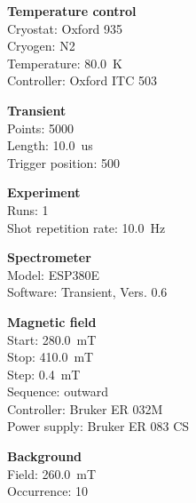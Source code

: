 \documentclass{article}
\begin{document}
\begin{multicols}{2}

	\begin{minipage}{.49\textwidth}
	\textbf{Temperature control}\\
						Cryostat: Oxford 935
			\\
								Cryogen: N2
			\\
								Temperature: 80.0~K
			\\
								Controller: Oxford ITC 503
			\\
				\end{minipage}
	\begin{minipage}{.49\textwidth}
	\textbf{Transient}\\
						Points: 5000
			\\
								Length: 10.0~us
			\\
								Trigger position: 500
			\\
				\end{minipage}
	\begin{minipage}{.49\textwidth}
	\textbf{Experiment}\\
						Runs: 1
			\\
								Shot repetition rate: 10.0~Hz
			\\
				\end{minipage}
	\begin{minipage}{.49\textwidth}
	\textbf{Spectrometer}\\
						Model: ESP380E
			\\
								Software: Transient, Vers. 0.6
			\\
				\end{minipage}
	\begin{minipage}{.49\textwidth}
	\textbf{Magnetic field}\\
																Start: 280.0~mT
			\\
								Stop: 410.0~mT
			\\
								Step: 0.4~mT
			\\
								Sequence: outward
			\\
								Controller: Bruker ER 032M
			\\
								Power supply: Bruker ER 083 CS
			\\
				\end{minipage}
	\begin{minipage}{.49\textwidth}
	\textbf{Background}\\
						Field: 260.0~mT
			\\
								Occurrence: 10
			\\

\end{minipage}
\end{multicols}
\end{document}
